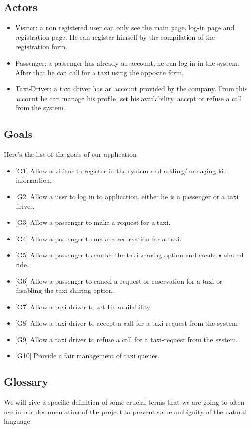 \documentclass[a4paper, 12pt, titlepage]{article}
\begin{document}
\subsection{Actors}
	\begin{itemize}
		\item Visitor: a non registered user can only see the main page, log-in page and registration page. He can register himself by the compilation of the registration form.
		\item Passenger: a passenger has already an account, he can log-in in the system. After that he can call for a taxi using the apposite form.
		\item Taxi-Driver: a taxi driver has an account provided by the company. From this account he can manage his profile, set his availability, accept or refuse a call from the system. 
	\end{itemize}

\subsection{Goals}
	Here's the list of the goals of our application
	\begin{itemize}
		\item {[G1]} Allow a visitor to register in the system and adding/managing his information.
		\item {[G2]} Allow a user to log in to application, either he is a passenger or a taxi driver.
		\item {[G3]} Allow a passenger to make a request for a taxi.
		\item {[G4]} Allow a passenger to make a reservation for a taxi.
		\item {[G5]} Allow a passenger to enable the taxi sharing option and create a shared ride.
		\item {[G6]} Allow a passenger to cancel a request or reservation for a taxi or disabling the taxi sharing option.
		\item {[G7]} Allow a taxi driver to set his availability.
		\item {[G8]} Allow a taxi driver to accept a call for a taxi-request from the system.
		\item {[G9]} Allow a taxi driver to refuse a call for a taxi-request from the system.
		\item {[G10]} Provide a fair management of taxi queues.
	\end{itemize}

\subsection{Glossary}
We will give a specific definition of some crucial terms that we are going to often use in our documentation of the project to prevent some ambiguity of the natural language.
\end{document}
